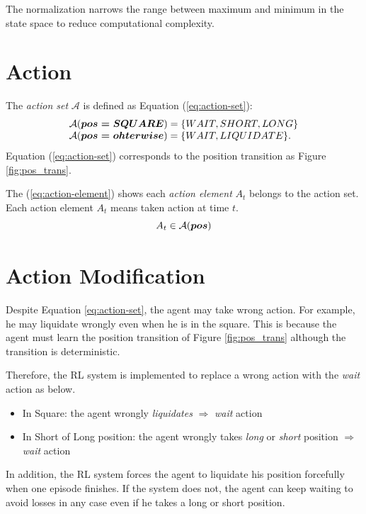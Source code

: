 The normalization narrows the range between maximum and minimum in the state space to reduce computational complexity.

\section{Action}
\label{sec:action}
The {\it action set} $\mathcal{A}$ is defined as Equation (\ref{eq:action-set}):
\begin{equation}
  \label{eq:action-set}
  \begin{array}{l}
   \mathcal{A}( \mbox{\boldmath{$ pos=SQUARE $}} )=\{ WAIT, SHORT, LONG \} \\
   \mathcal{A}( \mbox{\boldmath{$ pos=ohterwise $}} )=\{ WAIT, LIQUIDATE \}.
  \end{array}
\end{equation}
Equation (\ref{eq:action-set}) corresponds to the position transition as Figure \ref{fig:pos_trans}.

The (\ref{eq:action-element}) shows each {\it action element} $A_{t}$ belongs to the action set. Each action element $A_{t}$ means taken action at time $t$.
\begin{equation}
  \label{eq:action-element}
  A_{t} \in \mathcal{A}( \mbox{\boldmath{$ pos $}} )
\end{equation}

\section{Action Modification}
\label{sec:actMod}
Despite Equation \ref{eq:action-set}, the agent may take wrong action. For example, he may liquidate wrongly even when he is in the square. This is because the agent must learn the position transition of Figure \ref{fig:pos_trans} although the transition is deterministic.

Therefore, the RL system is implemented to replace a wrong action with the {\it wait} action as below.
\begin{itemize}
  \item In Square: the agent wrongly {\it liquidates} $\Longrightarrow$  {\it wait} action
  \item In Short of Long position: the agent wrongly takes {\it long} or {\it short} position $\Longrightarrow$  {\it wait} action
\end{itemize}

In addition, the RL system forces the agent to liquidate his position forcefully when one episode finishes. If the system does not, the agent can keep waiting to avoid losses in any case even if he takes a long or short position.

